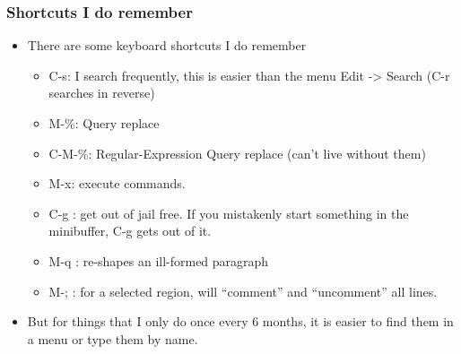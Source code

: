 \documentclass[11pt,english]{beamer}
\begin{document}
\begin{frame}[containsverbatim]
  \frametitle{Shortcuts I do remember}
  \begin{itemize}
  \item There are some keyboard shortcuts I do remember 

    \begin{itemize}
    \item C-s: I search frequently, this is easier than the menu Edit -> Search
      (C-r searches in reverse)
    \item M-\%: Query replace 
    \item C-M-\%: Regular-Expression Query replace (can't live without them)
    \item M-x: execute commands.
    \item C-g : get out of jail free. If you mistakenly start something in the
      minibuffer, C-g gets out of it.
    \item M-q : re-shapes an ill-formed paragraph
    \item M-; : for a selected region, will ``comment'' and ``uncomment''
      all lines.
    \end{itemize}
  \item But for things that I only do once every 6 months, it is easier to
    find them in a menu or type them by name. 
  \end{itemize}
\end{frame}
\end{document}

